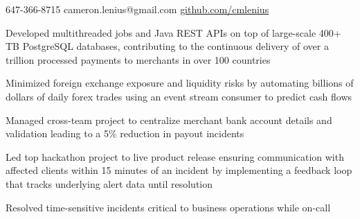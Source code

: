 \documentclass[]{resume}
\begin{document}
 
\separatorM

\contactLineFn
  {647-366-8715}
  {cameron.lenius@gmail.com}
  {\href{https://www.github.com/cmlenius}{github.com/cmlenius}}
   
\separatorL
{}
\separatorN

\begin{minipage}[t]{0.70\textwidth} 



\begin{tightemize}
\item Developed multithreaded jobs and Java REST APIs on top of large-scale 400+ TB PostgreSQL databases, contributing to the continuous delivery of over a trillion processed payments to merchants in over 100 countries
\item Minimized foreign exchange exposure and liquidity risks by automating billions of dollars of daily forex trades using an event stream consumer to predict cash flows
\item Managed cross-team project to centralize merchant bank account details and validation leading to a 5\% reduction in payout incidents
\item Led top hackathon project to live product release ensuring communication with affected clients within 15 minutes of an incident by implementing a feedback loop that tracks underlying alert data until resolution
\item Resolved time-sensitive incidents critical to business operations while on-call
\end{tightemize}
\separatorM


\end{minipage}
\end{document}
